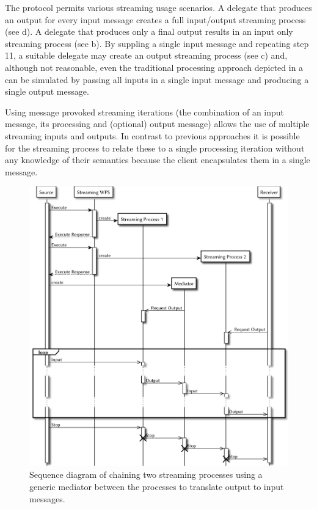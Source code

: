 		The protocol permits various streaming usage scenarios. A delegate that produces an output for every input message creates a full input/output streaming process (see d). A delegate that produces only a final output results in an input only streaming process (see b). By suppling a single input message and repeating step 11, a suitable delegate may create an output streaming process (see c) and, although not reasonable, even the traditional processing approach depicted in a can be simulated by passing all inputs in a single input message and producing a single output message.

		Using message provoked streaming iterations (the combination of an input message, its processing and (optional) output message) allows the use of multiple streaming inputs and outputs. In contrast to previous approaches it is possible for the streaming process to relate these to a single processing iteration without any knowledge of their semantics because the client encapsulates them in a single message.

		\begin{figure}[!htb]
			\centering
			\includegraphics[width=1\textwidth]{figures/sequence-diagramm-chain.pdf}
			\caption{\label{fig:sd:chain}Sequence diagram of chaining two streaming processes using a generic mediator between the processes to translate output to input messages.}
		\end{figure}

